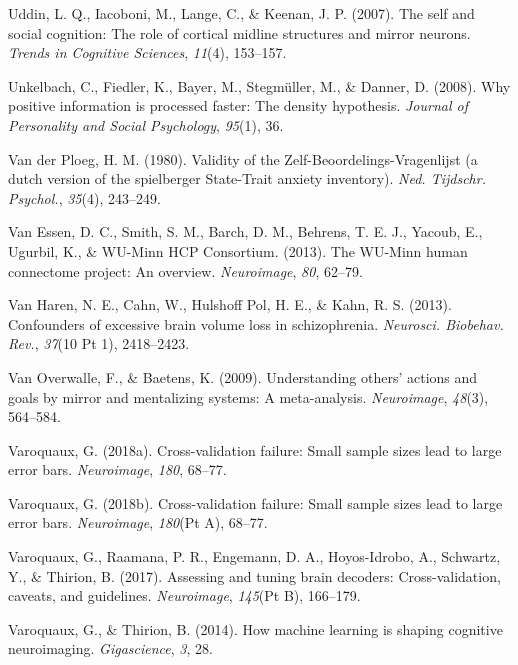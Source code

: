 \documentclass[11pt,american,a4paper,oneside,]{memoir} %
\begin{document}
\leavevmode\hypertarget{ref-uddin2007self}{}%
Uddin, L. Q., Iacoboni, M., Lange, C., \& Keenan, J. P. (2007). The self and social cognition: The role of cortical midline structures and mirror neurons. \emph{Trends in Cognitive Sciences}, \emph{11}(4), 153--157.

\leavevmode\hypertarget{ref-unkelbach2008positive}{}%
Unkelbach, C., Fiedler, K., Bayer, M., Stegmüller, M., \& Danner, D. (2008). Why positive information is processed faster: The density hypothesis. \emph{Journal of Personality and Social Psychology}, \emph{95}(1), 36.

\leavevmode\hypertarget{ref-Van_der_Ploeg1980-tq}{}%
Van der Ploeg, H. M. (1980). Validity of the Zelf-Beoordelings-Vragenlijst (a dutch version of the spielberger State-Trait anxiety inventory). \emph{Ned. Tijdschr. Psychol.}, \emph{35}(4), 243--249.

\leavevmode\hypertarget{ref-Van_Essen2013-df}{}%
Van Essen, D. C., Smith, S. M., Barch, D. M., Behrens, T. E. J., Yacoub, E., Ugurbil, K., \& WU-Minn HCP Consortium. (2013). The WU-Minn human connectome project: An overview. \emph{Neuroimage}, \emph{80}, 62--79.

\leavevmode\hypertarget{ref-Van_Haren2013-iv}{}%
Van Haren, N. E., Cahn, W., Hulshoff Pol, H. E., \& Kahn, R. S. (2013). Confounders of excessive brain volume loss in schizophrenia. \emph{Neurosci. Biobehav. Rev.}, \emph{37}(10 Pt 1), 2418--2423.

\leavevmode\hypertarget{ref-van2009understanding}{}%
Van Overwalle, F., \& Baetens, K. (2009). Understanding others' actions and goals by mirror and mentalizing systems: A meta-analysis. \emph{Neuroimage}, \emph{48}(3), 564--584.

\leavevmode\hypertarget{ref-varoquaux2018cross}{}%
Varoquaux, G. (2018a). Cross-validation failure: Small sample sizes lead to large error bars. \emph{Neuroimage}, \emph{180}, 68--77.

\leavevmode\hypertarget{ref-Varoquaux2018-uo}{}%
Varoquaux, G. (2018b). Cross-validation failure: Small sample sizes lead to large error bars. \emph{Neuroimage}, \emph{180}(Pt A), 68--77.

\leavevmode\hypertarget{ref-Varoquaux2017-fj}{}%
Varoquaux, G., Raamana, P. R., Engemann, D. A., Hoyos-Idrobo, A., Schwartz, Y., \& Thirion, B. (2017). Assessing and tuning brain decoders: Cross-validation, caveats, and guidelines. \emph{Neuroimage}, \emph{145}(Pt B), 166--179.

\leavevmode\hypertarget{ref-Varoquaux2014-su}{}%
Varoquaux, G., \& Thirion, B. (2014). How machine learning is shaping cognitive neuroimaging. \emph{Gigascience}, \emph{3}, 28.
\end{document}
